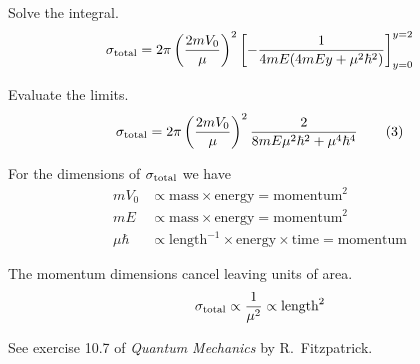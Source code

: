 Solve the integral.
\begin{equation*}
\sigma_{\rm total}=2\pi\left(\frac{2mV_0}{\mu}\right)^2
\left[-\frac{1}{4mE(4mEy+\mu^2\hbar^2)}\right]_{y=0}^{y=2}
\end{equation*}

Evaluate the limits.
\begin{equation*}
\sigma_{\rm total}=2\pi\left(\frac{2mV_0}{\mu}\right)^2
\frac{2}{8mE\mu^2\hbar^2+\mu^4\hbar^4}
\tag{3}
\end{equation*}

For the dimensions of $\sigma_{\rm total}$ we have
\begin{align*}
mV_0&\propto\text{mass}\times\text{energy}=\text{momentum}^2
\\
mE&\propto\text{mass}\times\text{energy}=\text{momentum}^2
\\
\mu\hbar&\propto\text{length}^{-1}\times\text{energy}\times\text{time}=\text{momentum}
\end{align*}

The momentum dimensions cancel leaving units of area.
\begin{equation*}
\sigma_{\rm total}\propto\frac{1}{\mu^2}\propto\text{length}^2
\end{equation*}

See exercise 10.7 of {\it Quantum Mechanics} by R.~Fitzpatrick.


